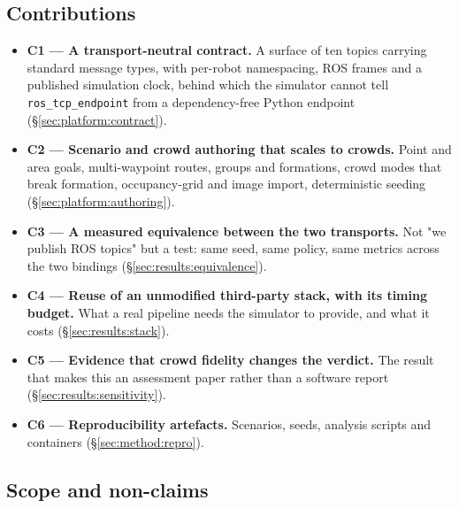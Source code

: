 \documentclass[pdflatex,sn-mathphys-num]{template/sn-jnl}%
\begin{document}
\subsection{Contributions}
\label{sec:intro:contrib}
\begin{itemize}
  \item \textbf{C1 --- A transport-neutral contract.} A surface of ten topics
        carrying standard message types, with per-robot namespacing, ROS
        frames and a published simulation clock, behind which the simulator
        cannot tell \texttt{ros\_tcp\_endpoint} from a dependency-free Python
        endpoint (\S\ref{sec:platform:contract}).
  \item \textbf{C2 --- Scenario and crowd authoring that scales to crowds.}
        Point and area goals, multi-waypoint routes, groups and formations,
        crowd modes that break formation, occupancy-grid and image import,
        deterministic seeding (\S\ref{sec:platform:authoring}).
  \item \textbf{C3 --- A measured equivalence between the two transports.}
        Not "we publish ROS topics" but a test: same seed, same policy, same
        metrics across the two bindings (\S\ref{sec:results:equivalence}).
  \item \textbf{C4 --- Reuse of an unmodified third-party stack, with its
        timing budget.} What a real pipeline needs the simulator to provide,
        and what it costs (\S\ref{sec:results:stack}).
  \item \textbf{C5 --- Evidence that crowd fidelity changes the verdict.}
        The result that makes this an assessment paper rather than a software
        report (\S\ref{sec:results:sensitivity}).
  \item \textbf{C6 --- Reproducibility artefacts.} Scenarios, seeds, analysis
        scripts and containers (\S\ref{sec:method:repro}).
\end{itemize}

\subsection{Scope and non-claims}
\label{sec:intro:scope}
\end{document}
